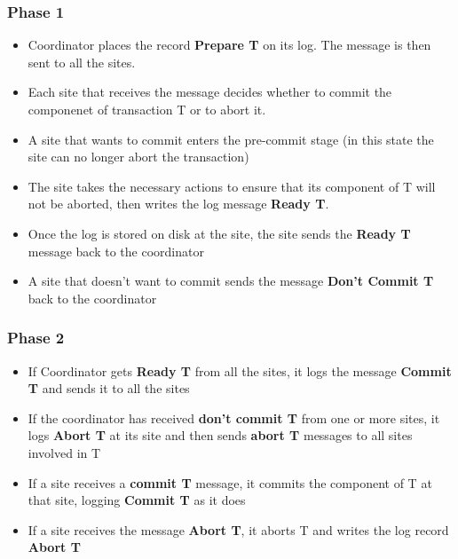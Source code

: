 \documentclass{article}
\begin{document}
\subsubsection{Phase 1}
\begin{itemize}
    \item Coordinator places the record \textbf{Prepare T} on its log. The message is then sent to all the sites.
    
    \item Each site that receives the message decides whether to commit the componenet of transaction T or to abort it. 
    
    \item A site that wants to commit enters the pre-commit stage (in this state the site can no longer abort the transaction)
    
    \item The site takes the necessary actions to ensure that its component of T will not be aborted, then writes the log message \textbf{Ready T}. 
    
    \item Once the log is stored on disk at the site, the site sends the \textbf{Ready T} message back to the coordinator
    
    \item A site that doesn't want to commit sends the message \textbf{Don't Commit T} back to the coordinator
\end{itemize}

\subsubsection{Phase 2}
\begin{itemize}
    \item If Coordinator gets \textbf{Ready T} from all the sites, it logs the message \textbf{Commit T} and sends it to all the sites
    
    \item If the coordinator has received \textbf{don’t commit T} from one or more sites, it logs \textbf{Abort T} at its site and then sends \textbf{abort T} messages to all sites involved in T

    
    \item If a site receives a \textbf{commit T} message, it commits the component of T at that site, logging \textbf{Commit T} as it does
    
    \item If a site receives the message \textbf{Abort T}, it aborts T and writes the log record \textbf{Abort T}
\end{itemize}
\end{document}
